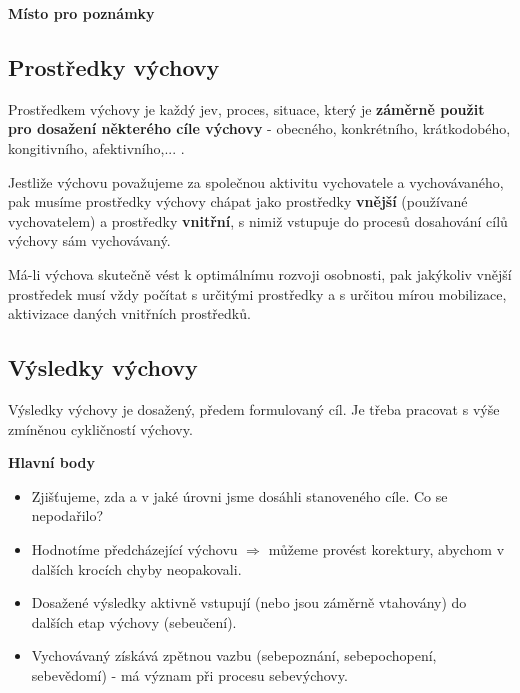 \documentclass[a4paper,12pt]{report}
\begin{document}
\begin{samepage}\begin{flushleft}
\end{flushleft}
\textbf{Místo pro poznámky}
\vspace{5cm}\pagelogos
\end{samepage}

\subsection*{Prostředky výchovy}
Prostředkem výchovy je každý jev, proces, situace, který je \textbf{záměrně použit pro dosažení některého cíle výchovy} - obecného, konkrétního, krátkodobého, kongitivního, afektivního,... . 

Jestliže výchovu považujeme za společnou aktivitu vychovatele a vychovávaného, pak musíme prostředky výchovy chápat jako prostředky \textbf{vnější} (používané vychovatelem) a prostředky \textbf{vnitřní}, s nimiž vstupuje do procesů dosahování cílů výchovy sám vychovávaný.

Má-li výchova skutečně vést k optimálnímu rozvoji osobnosti, pak jakýkoliv vnější prostředek musí vždy počítat s určitými prostředky a s určitou mírou mobilizace, aktivizace daných vnitřních prostředků.

\subsection*{Výsledky výchovy}
Výsledky výchovy je dosažený, předem formulovaný cíl. Je třeba pracovat s výše zmíněnou cykličností výchovy.

\textbf{Hlavní body}
\begin{itemize}
 \item Zjišťujeme, zda a v jaké úrovni jsme dosáhli stanoveného cíle. Co se nepodařilo?
 \item Hodnotíme předcházející výchovu $\Rightarrow$ můžeme provést korektury, abychom v dalších krocích chyby neopakovali.
 \item Dosažené výsledky aktivně vstupují (nebo jsou záměrně vtahovány) do dalších etap výchovy (sebeučení).
 \item Vychovávaný získává zpětnou vazbu (sebepoznání, sebepochopení, sebevědomí) - má význam při procesu sebevýchovy.
\end{itemize}
\end{document}
